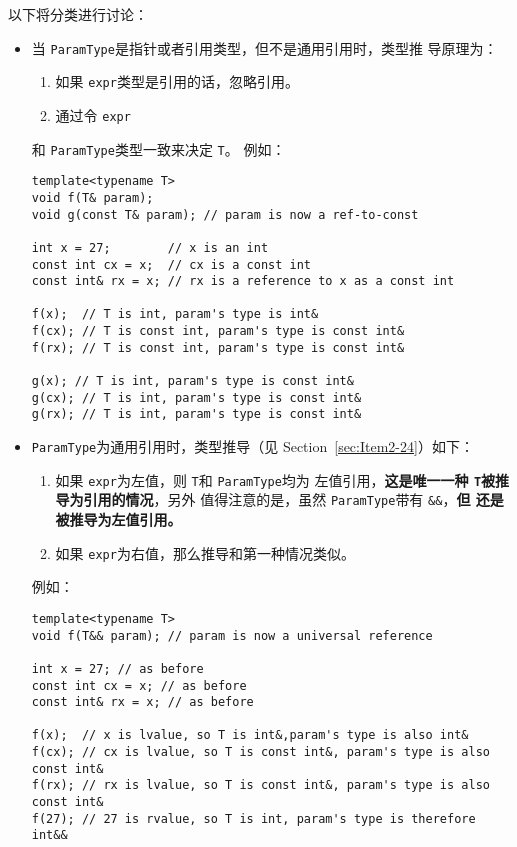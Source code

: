 \message{ !name(../CppLearning.tex)}\documentclass[a4paper,twoside]{article}
\theoremstyle{definition}
\theoremstyle{remark}
\numberwithin{equation}{section}
\let\OldTexttt\texttt
\renewcommand{\texttt}[1]{{\color{blue} \OldTexttt{#1}}}
\begin{document}
以下将分类进行讨论：
\begin{itemize}
\item 当\texttt{ParamType}是指针或者引用类型，但不是通用引用时，类型推
  导原理为：
    \begin{enumerate}
    \item 如果\texttt{expr}类型是引用的话，忽略引用。
    \item 通过令\texttt{expr}
    \end{enumerate}
    和\texttt{ParamType}类型一致来决定\texttt{T}。
  例如：
\begin{verbatim}
template<typename T>
void f(T& param);
void g(const T& param); // param is now a ref-to-const

int x = 27;        // x is an int
const int cx = x;  // cx is a const int
const int& rx = x; // rx is a reference to x as a const int

f(x);  // T is int, param's type is int&
f(cx); // T is const int, param's type is const int&
f(rx); // T is const int, param's type is const int&

g(x); // T is int, param's type is const int&
g(cx); // T is int, param's type is const int&
g(rx); // T is int, param's type is const int&
\end{verbatim}

  
\item \texttt{ParamType}为通用引用时，类型推导（见
  Section~\ref{sec:Item2-24}）如下：
  \begin{enumerate}
  \item 如果\texttt{expr}为左值，则\texttt{T}和\texttt{ParamType}均为
    左值引用，\textbf{这是唯一一种\texttt{T}被推导为引用的情况}，另外
    值得注意的是，虽然\texttt{ParamType}带有\texttt{\&\&}，\textbf{但
      还是被推导为左值引用。}
  \item 如果\texttt{expr}为右值，那么推导和第一种情况类似。
  \end{enumerate}

  例如：
\begin{verbatim}
template<typename T>
void f(T&& param); // param is now a universal reference

int x = 27; // as before
const int cx = x; // as before
const int& rx = x; // as before

f(x);  // x is lvalue, so T is int&,param's type is also int&
f(cx); // cx is lvalue, so T is const int&, param's type is also const int&
f(rx); // rx is lvalue, so T is const int&, param's type is also const int&
f(27); // 27 is rvalue, so T is int, param's type is therefore int&&
\end{verbatim}


\end{itemize}
\end{document}
